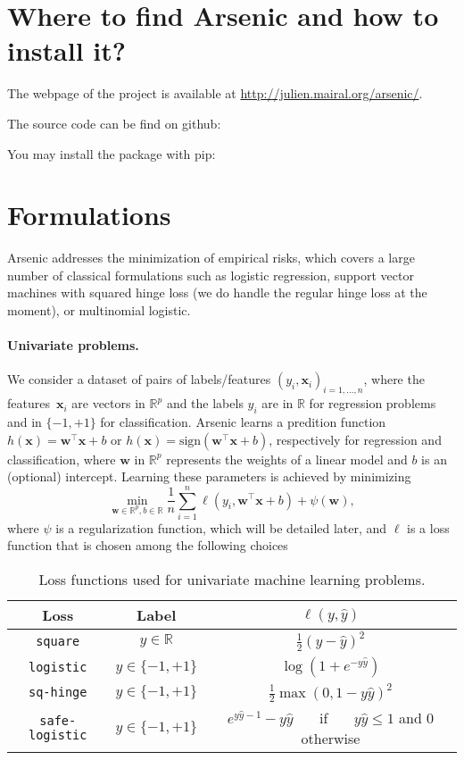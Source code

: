 \documentclass{article}
\def\x{{\mathbf{x}}}
\def\w{{\mathbf{w}}}
\def\haty{{\hat{y}}}
\def\wb{{\mathbf{w}}}
\def\Real{{\mathbb{R}}}
\begin{document}
\section{Where to find Arsenic and how to install it?}
The webpage of the project is available at \url{http://julien.mairal.org/arsenic/}.

The source code can be find on github:  

You may install the package with pip:

\section{Formulations}\label{sec:formulations}
Arsenic addresses the minimization of empirical risks, which covers a large
number of classical formulations such as logistic regression, support vector
machines with squared hinge loss (we do handle the regular hinge loss at the
moment), or multinomial logistic.


\paragraph{Univariate problems.} We consider a dataset of pairs of
labels/features $(y_i,\x_i)_{i=1,\ldots,n}$, where the features~$\x_i$ are
vectors in $\Real^p$ and the labels $y_i$ are in $\Real$ for regression
problems and in $\{-1,+1\}$ for classification.
Arsenic learns a predition function $h(\x)= \w^\top \x + b$ or $h(\x)=\text{sign}(\w^\top \x + b)$, respectively for regression and classification, 
where $\w$ in
$\Real^p$ represents the weights of a linear model and $b$ is an (optional)
intercept. Learning these parameters is achieved by minimizing
\begin{displaymath}
   \min_{\w \in \Real^p, b \in \Real} \frac{1}{n}\sum_{i=1}^n \ell(y_i, \wb^\top \x + b)  + \psi(\w), 
\end{displaymath}
where $\psi$ is a regularization function, which will be detailed later, and $\ell$ is a loss function that is chosen among the following choices
\begin{table}[h!]
   \centering
   \begin{tabular}{|c|c|c|}
      \hline
      Loss  & Label  &  $\ell(y, \hat{y})$ \\  
      \hline
      \texttt{square} &  $y \in \Real$ &  $\frac{1}{2}( y-\haty)^2$ \\ 
      \hline
      \texttt{logistic} &  $y \in \{-1,+1\}$ &  $ \log(1+e^{-y \hat{y}})$ \\ 
      \hline
      \texttt{sq-hinge} &  $y \in \{-1,+1\}$ &  $ \frac{1}{2}\max(0,1-y \hat{y})^2$ \\ 
      \hline
      \texttt{safe-logistic} &  $y \in \{-1,+1\}$ &  $e^{y \haty -1}- y \haty $~~~ if~~~ $ y \haty \leq 1$ and $0$ otherwise \\ 
      \hline
   \end{tabular}
   \caption{Loss functions used for univariate machine learning problems.} \label{table:loss}
\end{table}
\end{document}

